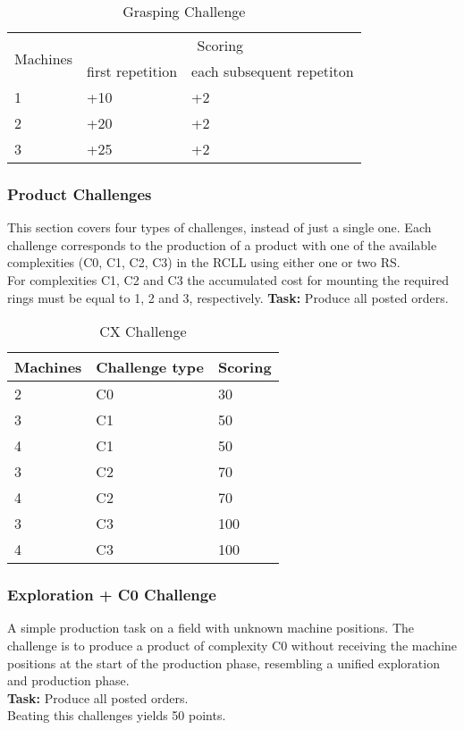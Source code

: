 \documentclass[12pt,twoside]{article}
\begin{document}
\begin{table}[!htb]
\centering
 \begin{tabular}{l|l|l}
  \multirow{2}{*}{Machines}
  & \multicolumn{2}{c}{Scoring} \\\cline{2-3}
  & first repetition
  & each subsequent repetiton  \\\hline\hline
  1 & +10 & +2 \\
  2 & +20 & +2 \\
  3 & +25 & +2 \\
 \end{tabular}
 \caption{Grasping Challenge}
 \label{tab:challenge-grasping}
\end{table}

\subsubsection{Product Challenges}\label{sec:challenge-cx}
This section covers four types of challenges, instead of just a single one.
Each challenge corresponds to the production of a product with one of the
available complexities (C0, C1, C2, C3) in the \ac{RCLL} using either
one or two \ac{RS}.\\
For complexities C1, C2 and C3 the accumulated cost for mounting the required
rings must be equal to 1, 2 and 3, respectively.
\textbf{Task:} Produce all posted orders.\\
\begin{table}[!htb]
 \centering
 \begin{tabular}{l|l|l}
  Machines & Challenge type & Scoring \\\hline
  2 & C0 & 30 \\
  3 & C1 & 50 \\
  4 & C1 & 50 \\
  3 & C2 & 70 \\
  4 & C2 & 70 \\
  3 & C3 & 100 \\
  4 & C3 & 100 \\
 \end{tabular}
 \caption{CX Challenge}
 \label{tab:challenge-cx}
\end{table}

\subsubsection{Exploration + C0 Challenge}\label{sec:challenge-combine-exp-c0}
A simple production task on a field with unknown machine positions.
The challenge is to produce a product of complexity C0 without receiving the
machine positions at the start of the production phase, resembling a unified
exploration and production phase.\\
\textbf{Task:} Produce all posted orders.\\
Beating this challenges yields 50 points.
\end{document}

